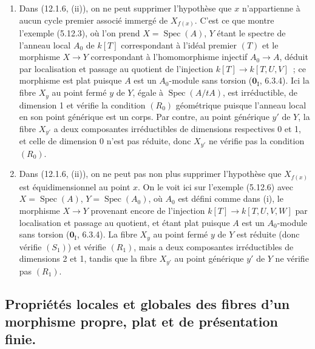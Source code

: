 \begin{remarks}[12.1.8]
\label{IV.12.1.8-fr}
\begin{enumerate}[label=(\roman*)]
  \item Dans (12.1.6, (ii)), on ne peut supprimer l'hypothèse que $x$
  n'appartienne à aucun cycle premier associé immergé de $X_{f(x)}$. C'est ce
  que montre l'exemple (5.12.3), où l'on prend $X=\operatorname{Spec}(A)$, $Y$
  étant le spectre de l'anneau local $A_0$ de $k[T]$ correspondant à l'idéal
  premier $(T)$ et le morphisme $X\to Y$ correspondant à l'homomorphisme
  injectif $A_0\to A$, déduit par localisation et passage au quotient de
  l'injection $k[T]\to k[T,U,V]$~; ce morphisme est plat puisque $A$ est un
  $A_0$-module sans torsion ($\mathbf 0_{\mathrm I}$, 6.3.4). Ici la fibre
  $X_y$ au point fermé $y$ de $Y$, égale à $\operatorname{Spec}(A/tA)$, est
  irréductible, de dimension 1 et vérifie la condition $(R_0)$ géométrique
  puisque l'anneau local en son point générique est un corps. Par contre, au
  point générique $y'$ de $Y$, la fibre $X_{y'}$ a deux composantes
  irréductibles de dimensions respectives 0 et 1, et celle de dimension 0
  n'est pas réduite, donc $X_{y'}$ ne vérifie pas la condition $(R_0)$.
  \item Dans (12.1.6, (ii)), on ne peut pas non plus supprimer l'hypothèse que
  $X_{f(x)}$ est équidimensionnel au point $x$. On le voit ici sur l'exemple
  (5.12.6) avec $X=\operatorname{Spec}(A)$, $Y=\operatorname{Spec}(A_0)$, où
  $A_0$ est défini comme dans (i), le morphisme $X\to Y$ provenant encore de
  l'injection $k[T]\to k[T,U,V,W]$ par localisation et passage au quotient, et
  étant plat puisque $A$ est un $A_0$-module sans torsion
  ($\mathbf 0_{\mathrm I}$, 6.3.4). La fibre $X_y$ au point fermé $y$ de $Y$
  est réduite (donc vérifie $(S_1)$) et vérifie $(R_1)$, mais a deux composantes
  irréductibles de dimensions 2 et 1, tandis que la fibre $X_{y'}$ au point
  générique $y'$ de $Y$ ne vérifie pas $(R_1)$.
\end{enumerate}
\end{remarks}
\subsection{Propriétés locales et globales des fibres d'un morphisme propre,
plat et de présentation finie.}
\label{subsection:IV.12.2-fr}

